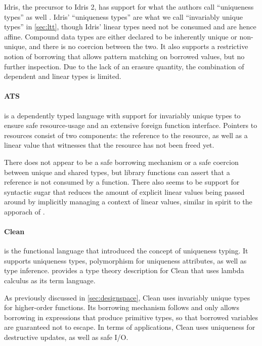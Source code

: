 Idris, the precursor to Idris 2, has support for what the authors call ``uniqueness types'' as well \citep{brady_type-driven_2017}. Idris' ``uniqueness types'' are what we call ``invariably unique types'' in \cref{sec:ltt}, though Idris' linear types need not be consumed and are hence affine. Compound data types are either declared to be inherently unique or non-unique, and there is no coercion between the two. It also supports a restrictive notion of borrowing that allows pattern matching on borrowed values, but no further inspection. Due to the lack of an erasure quantity, the combination of dependent and linear types is limited.

\paragraph{ATS \citep{shi_linear_2013}} is a dependently typed language with support for invariably unique types to ensure safe resource-usage and an extensive foreign function interface. Pointers to resources consist of two components: the reference to the resource, as well as a linear value that witnesses that the resource has not been freed yet. 

There does not appear to be a safe borrowing mechanism or a safe coercion between unique and shared types, but library functions can assert that a reference is not consumed by a function. There also seems to be support for syntactic sugar that reduces the amount of explicit linear values being passed around by implicitly managing a context of linear values, similar in spirit to the apporach of \cite{spiwack_linearly_2022}.

\paragraph{Clean \citep{smetsers_guaranteeing_1994}} is the functional language that introduced the concept of uniqueness typing. It supports uniqueness types, polymorphism for uniqueness attributes, as well as type inference. \cite{de_vries_making_2009} provides a type theory description for Clean that uses lambda calculus as its term language. 

As previously discussed in \cref{sec:designspace}, Clean uses invariably unique types for higher-order functions. Its borrowing mechanism follows \cite{wadler_linear_1990} and only allows borrowing in expressions that produce primitive types, so that borrowed variables are guaranteed not to escape. In terms of applications, Clean uses uniqueness for destructive updates, as well as safe I/O.

